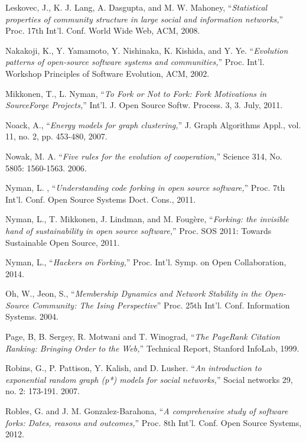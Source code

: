 \begin{thebibliography}{99.}
 Leskovec, J., K. J. Lang, A. Dasgupta, and M. W. Mahoney, ``\textit{Statistical properties of community structure in large social and information networks,}'' Proc. 17th Int'l. Conf. World Wide Web, ACM, 2008.  

 Nakakoji, K., Y. Yamamoto, Y. Nishinaka, K. Kishida, and Y. Ye. ``\textit{Evolution patterns of open-source software systems and communities,}'' Proc. Int'l. Workshop Principles of Software Evolution, ACM, 2002.

 Mikkonen, T., L. Nyman, ``\textit{To Fork or Not to Fork: Fork Motivations in SourceForge Projects,}'' Int'l. J. Open Source Softw. Process. 3, 3. July, 2011.

 Noack, A., ``\textit{Energy models for graph clustering,}'' J. Graph Algorithms Appl., vol. 11, no. 2, pp. 453-480, 2007.

 Nowak, M. A. ``\textit{Five rules for the evolution of cooperation,}'' Science 314, No. 5805: 1560-1563. 2006.

 Nyman, L. , ``\textit{Understanding code forking in open source software,}'' Proc. 7th Int'l. Conf. Open Source Systems Doct. Cons., 2011. 

 Nyman, L., T. Mikkonen, J. Lindman, and M. Foug\`{e}re, ``\textit{Forking: the invisible hand of sustainability in open source software,}'' Proc. SOS 2011: Towards Sustainable Open Source, 2011. 

 Nyman, L., ``\textit{Hackers on Forking,}'' Proc. Int'l. Symp. on Open Collaboration, 2014. 

 Oh, W., Jeon, S., ``\textit{Membership Dynamics and Network Stability in the Open-Source Community: The Ising Perspective}'' Proc. 25th Int'l. Conf. Information Systems. 2004.

 Page, B, B. Sergey, R. Motwani and T. Winograd, ``\textit{The PageRank Citation Ranking: Bringing Order to the Web,}'' Technical Report, Stanford InfoLab, 1999.

 Robins, G., P. Pattison, Y. Kalish, and D. Lusher. ``\textit{An introduction to exponential random graph (p*) models for social networks,}'' Social networks 29, no. 2: 173-191. 2007.

 Robles, G. and J. M. Gonzalez-Barahona, ``\textit{A comprehensive study of software forks: Dates, reasons and outcomes,}'' Proc. 8th Int'l. Conf. Open Source Systems, 2012. 


\end{thebibliography}
